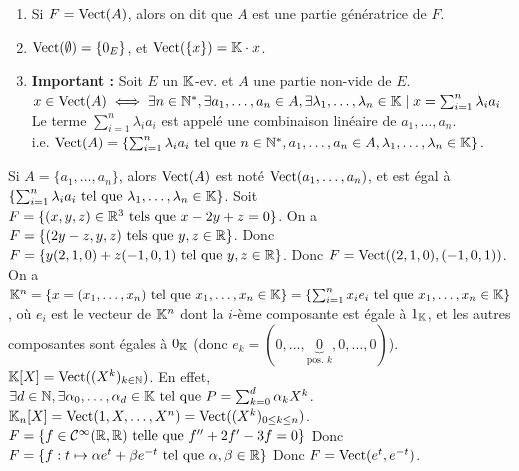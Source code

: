 \documentclass[12pt, a4paper]{report}
\begin{document}
\begin{remark}
    \begin{enumerate}
        \item Si $F = \mathrm{Vect}(A)$, alors on dit que $A$ est une partie génératrice de $F$.
        \item $\mathrm{Vect}(\emptyset) = \{0_E\}$, et $\mathrm{Vect}(\{x\}) = \mathbb{K} \cdot x$.
        \item \textbf{Important :} Soit $E$ un $\mathbb{K}$-ev. et $A$ une partie non-vide de $E$.\\$x \in \mathrm{Vect}(A) \iff \exists n \in \mathbb{N}^*, \exists a_1,\dots,a_n \in A, \exists \lambda_1,\dots,\lambda_n \in \mathbb{K} \mid x = \sum_{i=1}^n \lambda_i a_i$\\Le terme $\sum_{i=1}^n \lambda_i a_i$ est appelé une combinaison linéaire de $a_1,\dots,a_n$.\\i.e. $\mathrm{Vect}(A) = \{ \sum_{i=1}^{n}\lambda_i a_i \text{ tel que } n \in \mathbb{N}^*, a_1,\dots,a_n \in A, \lambda_1,\dots,\lambda_n \in \mathbb{K}\}$.
    \end{enumerate}
\end{remark}

\begin{example}
    \begin{outline}[enumerate]
        \1 Si $A = \{a_1,\dots,a_n\}$, alors $\mathrm{Vect}(A)$ est noté $\mathrm{Vect}(a_1,\dots,a_n)$, et est égal à $\{\sum_{i=1}^n \lambda_i a_i \text{ tel que } \lambda_1,\dots,\lambda_n \in \mathbb{K}\}$.
        \1 Soit $F = \{(x,y,z) \in \mathbb{R}^3 \text{ tels que } x-2y+z=0\}$.
        \2 On a $F = \{(2y - z, y, z) \text{ tels que } y,z \in \mathbb{R}\}$.
        \2 Donc $F = \{y(2,1,0) + z(-1,0,1) \text{ tel que } y,z \in \mathbb{R}\}$.
        \2 Donc $F = \mathrm{Vect}((2,1,0), (-1,0,1))$.
        \1 On a $\mathbb{K}^n = \{x = (x_1,\dots,x_n) \text{ tel que } x_1,\dots,x_n \in \mathbb{K}\} = \{\sum_{i=1}^n x_i e_i \text{ tel que } x_1,\dots,x_n \in \mathbb{K}\}$, où $e_i$ est le vecteur de $\mathbb{K}^n$ dont la $i$-ème composante est égale à $1_{\mathbb{K}}$, et les autres composantes sont égales à $0_{\mathbb{K}}$ (donc $e_k = (0,\dots,\underbrace{0}_{\text{pos. } k},0,\dots,0)$).
        \1 $\mathbb{K}[X] = \mathrm{Vect}((X^k)_{k \in \mathbb{N}})$.
        \2 En effet, $\exists d \in \mathbb{N}, \exists \alpha_0,\dots,\alpha_d \in \mathbb{K} \text{ tel que } P = \sum_{k=0}^{d}\alpha_k X^k$.
        \1 $\mathbb{K}_n[X] = \mathrm{Vect}(1,X,\dots,X^n) = \mathrm{Vect}((X^k)_{0 \leq k \leq n})$.
        \1 $F = \{ f \in \mathcal{C}^{\infty}(\mathbb{R},\mathbb{R}) \text{ telle que } f'' + 2f' - 3f = 0\}$
        \2 Donc $F = \{f:t\mapsto \alpha e^t + \beta e^{-t} \text{ tel que } \alpha,\beta \in \mathbb{R}\}$
        \2 Donc $F = \mathrm{Vect}(e^t, e^{-t})$.
    \end{outline}
\end{example}
\end{document}
